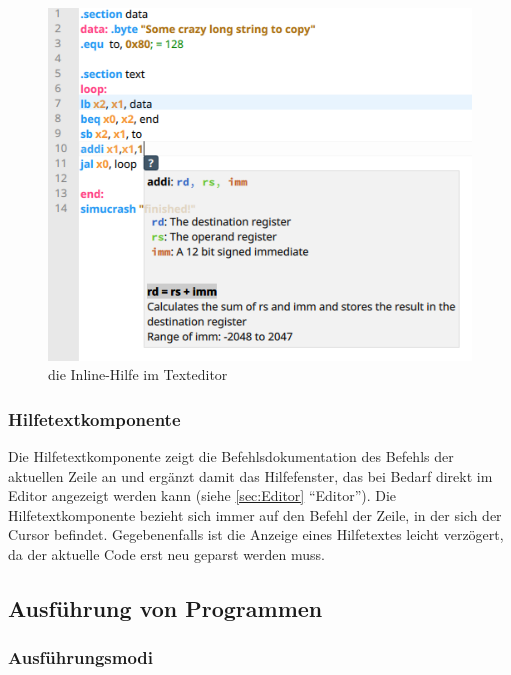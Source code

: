 \begin{figure}[ht]
	\centering
  \includegraphics[scale=0.7]{Images/Editor_help}
	\caption{die Inline-Hilfe im Texteditor}
	\label{Editor_Help}
\end{figure}




\subsubsection{Hilfetextkomponente}
\label{help-component}

Die Hilfetextkomponente zeigt die Befehlsdokumentation des Befehls der aktuellen
Zeile an und ergänzt damit das Hilfefenster, das bei Bedarf direkt im Editor
angezeigt werden kann (siehe \ref{sec:Editor} ``Editor''). Die
Hilfetextkomponente bezieht sich immer auf den Befehl der Zeile, in der sich der
Cursor befindet. Gegebenenfalls ist die Anzeige eines Hilfetextes leicht
verzögert, da der aktuelle Code erst neu geparst werden muss.


\subsection{Ausführung von Programmen}

\subsubsection{Ausführungsmodi}

